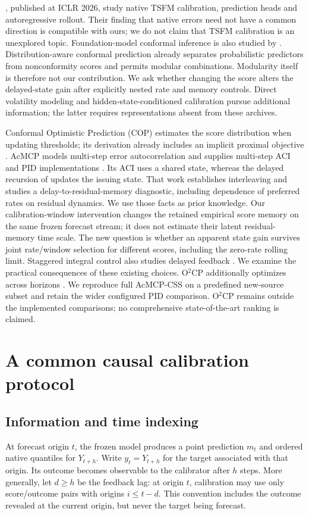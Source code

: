 \documentclass[preprint,11pt]{elsarticle}
\begin{document}
\citet{adler2025calibration}, published at ICLR 2026, study native TSFM calibration,
prediction heads and autoregressive rollout. Their finding that native errors need not
have a common direction is compatible with ours; we do not claim that TSFM calibration
is an unexplored topic. Foundation-model conformal inference is also studied by
\citet{achour2025fm}. Distribution-aware conformal prediction \citep{schweizer2026dcp}
already separates probabilistic predictors from nonconformity scores and permits
modular combinations. Modularity itself is therefore not our contribution. We ask
whether changing the score alters the delayed-state gain after explicitly nested
rate and memory controls. Direct volatility modeling \citep{cho2026volatility} and
hidden-state-conditioned calibration \citep{zhu2025afocp} pursue additional information;
the latter requires representations absent from these archives.

Conformal Optimistic Prediction (COP) estimates the score distribution when updating
thresholds; its derivation already includes an implicit proximal objective
\citep{hu2026cop}. AcMCP models multi-step error autocorrelation and supplies multi-step
ACI and PID implementations \citep{wang2026acmcp}. Its ACI uses a shared state, whereas
the delayed recursion of \citet{elhalabi2026delayed} updates the issuing state.
That work establishes interleaving and studies a delay-to-residual-memory diagnostic,
including dependence of preferred rates on residual dynamics. We use those facts as
prior knowledge. Our calibration-window intervention changes the retained empirical
score memory on the same frozen forecast stream; it does not estimate their latent
residual-memory time scale. The new question is whether an apparent state gain survives
joint rate/window selection for different scores, including the zero-rate rolling limit.
Staggered integral control also studies delayed feedback \citep{cherenson2026staggered}.
We examine the practical consequences of these existing choices. O$^2$CP additionally
optimizes across horizons \citep{li2026o2cp}. We reproduce full AcMCP-CSS on a predefined
new-source subset and retain the wider configured PID comparison. O$^2$CP remains
outside the implemented comparisons; no comprehensive state-of-the-art ranking is claimed.

\section{A common causal calibration protocol}
\subsection{Information and time indexing}
At forecast origin $t$, the frozen model produces a point prediction $m_t$ and ordered
native quantiles for $Y_{t+h}$. Write $y_t=Y_{t+h}$ for the target associated with that
origin. Its outcome becomes observable to the calibrator after $h$ steps. More generally,
let $d\geq h$ be the feedback lag: at origin $t$, calibration may use only score/outcome
pairs with origins $i\leq t-d$. This convention includes the outcome revealed at the
current origin, but never the target being forecast.
\end{document}
